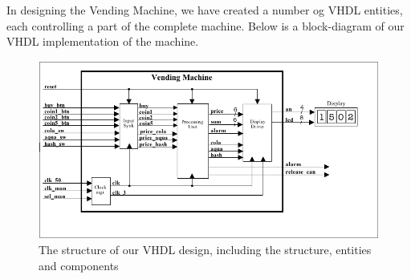 In designing the Vending Machine, we have created a number og VHDL entities, each controlling a part of the complete machine. Below is a block-diagram of our VHDL implementation of the machine. 

\begin{figure}[!h]
\centering
\includegraphics[scale=0.7]{figs/structure.png} 
\caption{The structure of our VHDL design, including the structure, entities and components}
\label{fig:structure}
\end{figure}